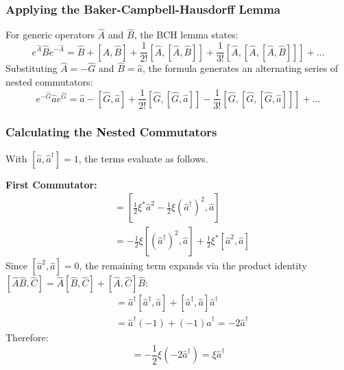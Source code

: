 {\subsubsection{Applying the Baker-Campbell-Hausdorff Lemma}
For generic operators $\hat{A}$ and $\hat{B}$, the BCH lemma states:
\begin{equation*}
e^{\hat{A}} \hat{B} e^{-\hat{A}} = \hat{B} + [\hat{A}, \hat{B}] + \frac{1}{2!}[\hat{A}, [\hat{A}, \hat{B}]] + \frac{1}{3!}[\hat{A}, [\hat{A}, [\hat{A}, \hat{B}]]] + \dots
\end{equation*}
Substituting $\hat{A} = -\hat{G}$ and $\hat{B} = \hat{a}$, the formula generates an alternating series of nested commutators:
\begin{equation*}
e^{-\hat{G}} \hat{a} e^{\hat{G}} = \hat{a} - [\hat{G}, \hat{a}] + \frac{1}{2!}[\hat{G}, [\hat{G}, \hat{a}]] - \frac{1}{3!}[\hat{G}, [\hat{G}, [\hat{G}, \hat{a}]]] + \dots
\end{equation*}

\subsubsection{Calculating the Nested Commutators}
With $[\hat{a}, \hat{a}^\dagger] = 1$, the terms evaluate as follows.

\textbf{First Commutator:}
\begin{align*}
[\hat{G}, \hat{a}] &= \left[ \frac{1}{2}\xi^*\hat{a}^2 - \frac{1}{2}\xi(\hat{a}^\dagger)^2, \hat{a} \right] \\
&= -\frac{1}{2}\xi [(\hat{a}^\dagger)^2, \hat{a}] + \frac{1}{2}\xi^* [\hat{a}^2, \hat{a}]
\end{align*}
Since $[\hat{a}^2, \hat{a}] = 0$, the remaining term expands via the product identity $[\hat{A}\hat{B}, \hat{C}] = \hat{A}[\hat{B}, \hat{C}] + [\hat{A}, \hat{C}]\hat{B}$:
\begin{align*}
[(\hat{a}^\dagger)^2, \hat{a}] &= \hat{a}^\dagger[\hat{a}^\dagger, \hat{a}] + [\hat{a}^\dagger, \hat{a}]\hat{a}^\dagger \\
&= \hat{a}^\dagger(-1) + (-1)\hat{a}^\dagger = -2\hat{a}^\dagger
\end{align*}
Therefore:
\begin{equation*}
[\hat{G}, \hat{a}] = -\frac{1}{2}\xi(-2\hat{a}^\dagger) = \xi\hat{a}^\dagger
\end{equation*}

}
